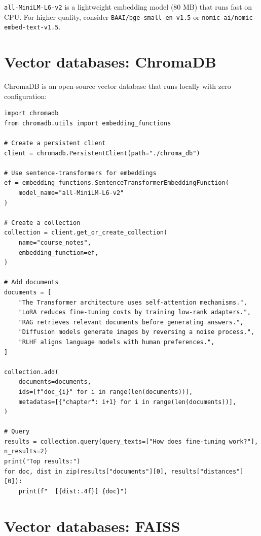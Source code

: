 \begin{aitip}
\texttt{all-MiniLM-L6-v2} is a lightweight embedding model (80 MB) that runs fast on CPU. For higher quality, consider \texttt{BAAI/bge-small-en-v1.5} or \texttt{nomic-ai/nomic-embed-text-v1.5}.
\end{aitip}

\section{Vector databases: ChromaDB}

ChromaDB is an open-source vector database that runs locally with zero configuration:

\begin{verbatim}
import chromadb
from chromadb.utils import embedding_functions

# Create a persistent client
client = chromadb.PersistentClient(path="./chroma_db")

# Use sentence-transformers for embeddings
ef = embedding_functions.SentenceTransformerEmbeddingFunction(
    model_name="all-MiniLM-L6-v2"
)

# Create a collection
collection = client.get_or_create_collection(
    name="course_notes",
    embedding_function=ef,
)

# Add documents
documents = [
    "The Transformer architecture uses self-attention mechanisms.",
    "LoRA reduces fine-tuning costs by training low-rank adapters.",
    "RAG retrieves relevant documents before generating answers.",
    "Diffusion models generate images by reversing a noise process.",
    "RLHF aligns language models with human preferences.",
]

collection.add(
    documents=documents,
    ids=[f"doc_{i}" for i in range(len(documents))],
    metadatas=[{"chapter": i+1} for i in range(len(documents))],
)

# Query
results = collection.query(query_texts=["How does fine-tuning work?"], n_results=2)
print("Top results:")
for doc, dist in zip(results["documents"][0], results["distances"][0]):
    print(f"  [{dist:.4f}] {doc}")
\end{verbatim}

\section{Vector databases: FAISS}

